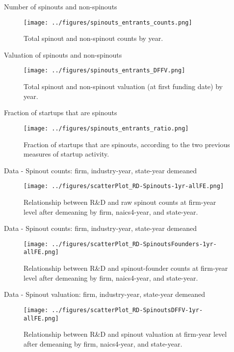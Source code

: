 \documentclass[english,usenames,dvipsnames]{beamer}
\begin{document}
\begin{frame}{Number of spinouts and non-spinouts}
\begin{figure}
	\texttt{[image: ../figures/spinouts\_entrants\_counts.png]}
	\caption{Total spinout and non-spinout counts by year.}
\end{figure}
\end{frame}

\begin{frame}{Valuation of spinouts and non-spinouts}
\begin{figure}
	\texttt{[image: ../figures/spinouts\_entrants\_DFFV.png]}
	\caption{Total spinout and non-spinout valuation (at first funding date) by year.}
\end{figure}
\end{frame}

\begin{frame}{Fraction of startups that are spinouts}
\begin{figure}
	\texttt{[image: ../figures/spinouts\_entrants\_ratio.png]}
	\caption{Fraction of startups that are spinouts, according to the two previous measures of startup activity.}
\end{figure}
\end{frame}


\begin{frame}{Data - Spinout counts: firm, industry-year, state-year demeaned}
\begin{figure}
	\texttt{[image: ../figures/scatterPlot\_RD-Spinouts-1yr-allFE.png]}
	\caption{Relationship between R\&D and raw spinout counts at firm-year level after demeaning by firm, naics4-year, and state-year.}
\end{figure}
\end{frame}


\begin{frame}{Data - Spinout counts: firm, industry-year, state-year demeaned}
\begin{figure}
	\texttt{[image: ../figures/scatterPlot\_RD-SpinoutsFounders-1yr-allFE.png]}
	\caption{Relationship between R\&D and spinout-founder counts at firm-year level after demeaning by firm, naics4-year, and state-year.}
\end{figure}
\end{frame}

\begin{frame}{Data - Spinout valuation: firm, industry-year, state-year demeaned}
\begin{figure}
	\texttt{[image: ../figures/scatterPlot\_RD-SpinoutsDFFV-1yr-allFE.png]}
	\caption{Relationship between R\&D and spinout valuation at firm-year level after demeaning by firm, naics4-year, and state-year.}
\end{figure}
\end{frame}
\end{document}
